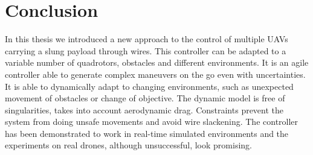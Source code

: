 %
\chapter{Conclusion} \label{chap::conclusion}
In this thesis we introduced a new approach to the control of multiple \acp{UAV} carrying a slung payload through wires. This controller can be adapted to a variable number of quadrotors, obstacles and different environments. It is an agile controller able to generate complex maneuvers on the go even with uncertainties. It is able to dynamically adapt to changing environments, such as unexpected movement of obstacles or change of objective. The dynamic model is free of singularities, takes into account aerodynamic drag. Constraints prevent the system from doing unsafe movements and avoid wire slackening. The controller has been demonstrated to work in real-time simulated environments and the experiments on real drones, although unsuccessful, look promising.

